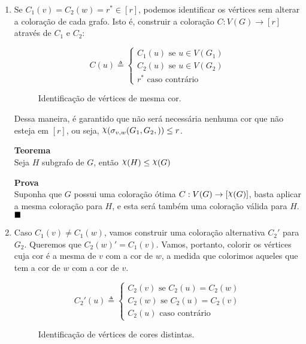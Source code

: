 \documentclass{homework}
\begin{document}
	\begin{enumerate}[label=\Roman*.]
		\item Se $C_1(v) = C_2(w) = r^{\ast} \in [r]$, podemos identificar os vértices sem alterar a coloração de cada grafo. Isto é, construir a coloração $C : V(G) \to [r]$ através de $C_1$ e $C_2$: \par
		
		$$C(u) \triangleq \begin{cases}
		C_1(u) \text{ se } u \in V(G_1)\\
		C_2(u) \text{ se } u \in V(G_2)\\
		r^{\ast} \text{ caso contrário}
		\end{cases}$$
		
		\begin{figure}[H]
			\centering
			
			\caption{Identificação de vértices de mesma cor.}
			\label{fig:2.2}
		\end{figure}
		
		Dessa maneira, é garantido que não será necessária nenhuma cor que não esteja em $[r]$, ou seja, $\rchi(\sigma_{v, w}(G_1, G_2,)) \le r$.
		
		\textbf{Teorema}\\
		Seja $H$ subgrafo de $G$, então $\rchi(H) \le \rchi(G)$
		
		\textbf{Prova}\\
		Suponha que $G$ possui uma coloração ótima $ C : V(G) \to [\rchi(G)] $, basta aplicar a mesma coloração para $H$, e esta será também uma coloração válida para $H$. $\blacksquare$
		
		\item Caso $C_1(v) \neq C_1(w)$, vamos construir uma coloração alternativa $C_2'$ para $G_2$. Queremos que $C_2(w)' = C_1(v)$. Vamos, portanto, colorir os vértices cuja cor é a mesma de $v$ com a cor de $w$, a medida que colorimos aqueles que tem a cor de $w$ com a cor de $v$. \par
		
		$$C_2'(u) \triangleq \begin{cases}
		C_2(v) \text{ se } C_2(u) = C_2(w)\\
		C_2(w) \text{ se } C_2(u) = C_2(v)\\
		C_2(u) \text{ caso contrário}
		\end{cases}$$
		
		\begin{figure}[H]
			\centering
			
			\caption{Identificação de vértices de cores distintas.}
			\label{fig:2.3}
		\end{figure}
		

\end{enumerate}
\end{document}
